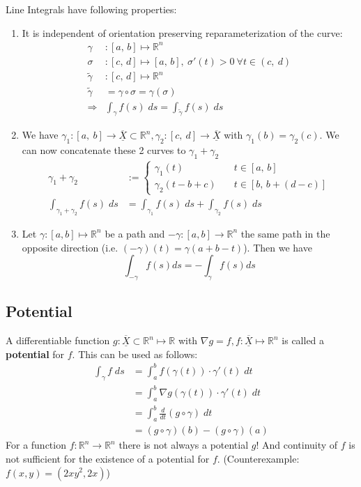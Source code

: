 \documentclass[a4paper,fontsize = 8pt]{scrartcl}
\def\R{\mathbb{R}}
\def\X{\underline{\overline{X}}}
\begin{document}
Line Integrals have following properties:
\begin{enumerate}
  \item It is independent of orientation preserving reparameterization of the curve:
  \begin{align*}
    \gamma&: [a,\, b] \mapsto \R^n\\
    \sigma&: [c, \, d] \mapsto [a, \, b], \ \sigma'(t) > 0 \ \forall t \in (c, \ d)\\
    \tilde{\gamma}&: [c,\, d] \mapsto \R^n\\
    \tilde{\gamma} &= \gamma \circ \sigma = \gamma(\sigma)\\
    \Rightarrow &\int_\gamma f(s) \; ds = \int_{\tilde{\gamma}} f(s) \; ds
  \end{align*}
  \item We have $\gamma_1: [a, \ b] \to \X \subset \R^n, \gamma_2: [c, \ d] \to \X$ with $\gamma_1(b) = \gamma_2(c)$. We can now concatenate these 2 curves to \(\gamma_1 + \gamma_2\) 
  \begin{align*}
    \gamma_1 + \gamma_2 &:=
    \begin{cases}
      \gamma_1(t) \quad& t \in [a, \, b]\\
      \gamma_2(t - b + c) \quad& t \in [b, \, b+ (d - c)]
    \end{cases}\\
    \int_{\gamma_1 + \gamma_2} f(s) \; ds &= \int_{\gamma_1} f(s) \; ds + \int_{\gamma_2} f(s)\; ds
  \end{align*}
  \item Let \(\gamma : \left[a,b\right] \mapsto \R^n\) be a path and \(-\gamma: [a, b] \to \R^n\) the same path in the opposite direction (i.e. \((-\gamma)(t) = \gamma(a + b - t)\)). Then we have
  \[\int_{-\gamma} f(s)ds = -\int_\gamma f(s) ds\]
\end{enumerate}

\subsection{Potential}
A differentiable function \(g: \X \subset \R^n \mapsto \R\) with \(\nabla g = f, f: \X \mapsto \R^n\) is called a \textbf{potential} for \(f\). This can be used as follows:
\begin{align*}
  \int_\gamma f \; ds &= \int_a^b f(\gamma(t)) \cdot \gamma'(t) \; dt\\
  &= \int_a^b \nabla g(\gamma(t)) \cdot \gamma'(t) \; dt\\
  &= \int_a^b \frac{d}{dt} (g \circ \gamma) \; dt\\
  &= (g \circ \gamma)(b) - (g \circ \gamma)(a)
\end{align*}
For a function $f: \R^n \to \R^n$ there is not always a potential $g$! And continuity of $f$ is not sufficient for the existence of a potential for $f$. (Counterexample: $f(x,y) = (2xy^2,2x)$)
\end{document}
